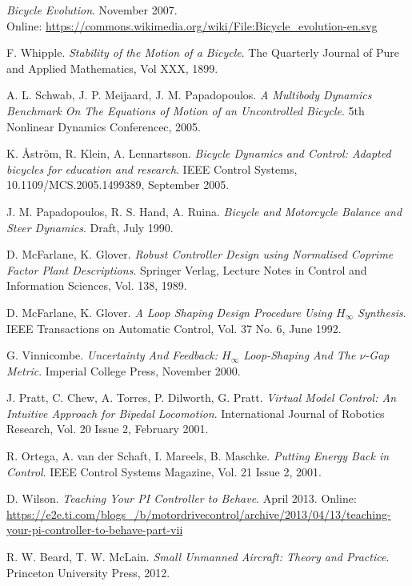 \newpage
\begin{thebibliography}{9}
\textit{Bicycle Evolution}. November 2007. \\
Online: \url{https://commons.wikimedia.org/wiki/File:Bicycle_evolution-en.svg}

F. Whipple. \textit{Stability of the Motion of a Bicycle}. The Quarterly Journal of Pure and Applied Mathematics, Vol XXX, 1899.

A. L. Schwab, J. P. Meijaard, J. M. Papadopoulos. \textit{A Multibody Dynamics Benchmark On The Equations of Motion of an Uncontrolled Bicycle}. 5th Nonlinear Dynamics Conferencec, 2005. 

K. \AA str{\"o}m, R. Klein, A. Lennartsson. \textit{Bicycle Dynamics and Control: Adapted bicycles for education and research}. IEEE Control Systems, 10.1109/MCS.2005.1499389, September 2005.

J. M. Papadopoulos, R. S. Hand, A. Ruina. \textit{Bicycle and Motorcycle Balance and Steer Dynamics}. Draft, July 1990.

D. McFarlane, K. Glover. \textit{Robust Controller Design using Normalised Coprime Factor Plant Descriptions}. Springer Verlag, Lecture Notes in Control and Information Sciences, Vol. 138, 1989.

D. McFarlane, K. Glover. \textit{A Loop Shaping Design Procedure Using $H_{\infty}$ Synthesis}. IEEE Transactions on Automatic Control, Vol. 37 No. 6, June 1992.

G. Vinnicombe. \textit{Uncertainty And Feedback: $H_{\infty}$ Loop-Shaping And The $\nu$-Gap Metric}. Imperial College Press, November 2000.

J. Pratt, C. Chew, A. Torres, P. Dilworth, G. Pratt. \textit{Virtual Model Control: An Intuitive Approach for Bipedal Locomotion}. International Journal of Robotics Research, Vol. 20 Issue 2, February 2001.

R. Ortega, A. van der Schaft, I. Mareels, B. Maschke. \textit{Putting Energy Back in Control}. IEEE Control Systems Magazine, Vol. 21 Issue 2, 2001.

D. Wilson. \textit{Teaching Your PI Controller to Behave}. April 2013. Online: \\\url{https://e2e.ti.com/blogs_/b/motordrivecontrol/archive/2013/04/13/teaching-your-pi-controller-to-behave-part-vii}

R. W. Beard, T. W. McLain. \textit{Small Unmanned Aircraft: Theory and Practice}. Princeton University Press, 2012.

\end{thebibliography}